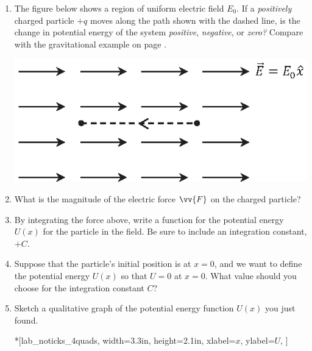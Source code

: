 \begin{enumerate}[labparts]

\item The figure below shows a region of uniform electric field $E_0$.  If a \textit{positively} charged particle $+q$ moves along the path shown with the dashed line, is the change in potential energy of the system \textit{positive}, \textit{negative}, or \textit{zero?}  Compare with the gravitational example on page \pageref{part_potential_intro_grav_work}.
\begin{center}
\includegraphics{potential_intro/activity_2_figs/uniform_E_field.eps}
\end{center}


\item What is the magnitude of the electric force $\vv{F}$ on the charged particle?
\answerspace{0.3in}

\item By integrating the force above, write a function for the potential energy $U(x)$ for the particle in the field.  Be sure to include an integration constant, $+C$.
\answerspace{0.3in}

\item Suppose that the particle's initial position is at $x=0$, and we want to define the potential energy $U(x)$ so that $U=0$ at $x=0$.  What value should you choose for the integration constant $C$?
\answerspace{0.3in}

\item Sketch a qualitative graph of the potential energy function $U(x)$ you just found.
\begin{lab_axis}*[lab_noticks_4quads,
	width={3.3in}, height={2.1in},
	xlabel={$x$},
	ylabel={$U$},
	]
\end{lab_axis}


\end{enumerate}
